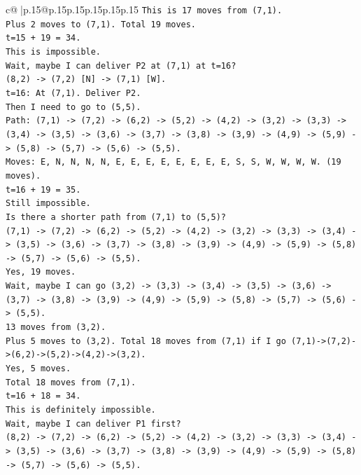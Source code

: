 \documentclass{article}
\begin{document}
{\begin{supertabular}{c@{$\;$}|p{.15\linewidth}@{}p{.15\linewidth}p{.15\linewidth}p{.15\linewidth}p{.15\linewidth}p{.15\linewidth}}
{{{\texttt{This is 17 moves from (7,1).} \\
\texttt{Plus 2 moves to (7,1). Total 19 moves.} \\
\texttt{t=15 + 19 = 34.} \\
\texttt{This is impossible.} \\
\texttt{Wait, maybe I can deliver P2 at (7,1) at t=16?} \\
\texttt{(8,2) {-}> (7,2) {[}N{]} {-}> (7,1) {[}W{]}.} \\
\texttt{t=16: At (7,1). Deliver P2.} \\
\texttt{Then I need to go to (5,5).} \\
\texttt{Path: (7,1) {-}> (7,2) {-}> (6,2) {-}> (5,2) {-}> (4,2) {-}> (3,2) {-}> (3,3) {-}> (3,4) {-}> (3,5) {-}> (3,6) {-}> (3,7) {-}> (3,8) {-}> (3,9) {-}> (4,9) {-}> (5,9) {-}> (5,8) {-}> (5,7) {-}> (5,6) {-}> (5,5).} \\
\texttt{Moves: E, N, N, N, N, E, E, E, E, E, E, E, E, S, S, W, W, W, W. (19 moves).} \\
\texttt{t=16 + 19 = 35.} \\
\texttt{Still impossible.} \\
\texttt{Is there a shorter path from (7,1) to (5,5)?} \\
\texttt{(7,1) {-}> (7,2) {-}> (6,2) {-}> (5,2) {-}> (4,2) {-}> (3,2) {-}> (3,3) {-}> (3,4) {-}> (3,5) {-}> (3,6) {-}> (3,7) {-}> (3,8) {-}> (3,9) {-}> (4,9) {-}> (5,9) {-}> (5,8) {-}> (5,7) {-}> (5,6) {-}> (5,5).} \\
\texttt{Yes, 19 moves.} \\
\texttt{Wait, maybe I can go (3,2) {-}> (3,3) {-}> (3,4) {-}> (3,5) {-}> (3,6) {-}> (3,7) {-}> (3,8) {-}> (3,9) {-}> (4,9) {-}> (5,9) {-}> (5,8) {-}> (5,7) {-}> (5,6) {-}> (5,5).} \\
\texttt{13 moves from (3,2).} \\
\texttt{Plus 5 moves to (3,2). Total 18 moves from (7,1) if I go (7,1){-}>(7,2){-}>(6,2){-}>(5,2){-}>(4,2){-}>(3,2).} \\
\texttt{Yes, 5 moves.} \\
\texttt{Total 18 moves from (7,1).} \\
\texttt{t=16 + 18 = 34.} \\
\texttt{This is definitely impossible.} \\
\texttt{Wait, maybe I can deliver P1 first?} \\
\texttt{(8,2) {-}> (7,2) {-}> (6,2) {-}> (5,2) {-}> (4,2) {-}> (3,2) {-}> (3,3) {-}> (3,4) {-}> (3,5) {-}> (3,6) {-}> (3,7) {-}> (3,8) {-}> (3,9) {-}> (4,9) {-}> (5,9) {-}> (5,8) {-}> (5,7) {-}> (5,6) {-}> (5,5).} \\
}}}
\end{supertabular}}
\end{document}
